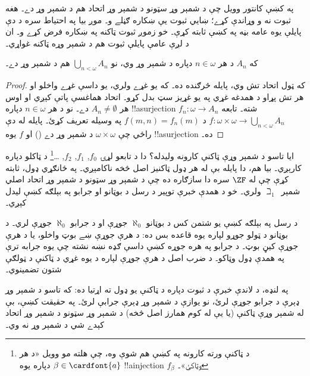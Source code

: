 \documentclass[../../../include/open-logic-section]{subfiles}
\begin{document}
\begin{ex}
په \citeyear{Cantor1878} کښې کانتور وويل
چې د شمېر وړ سټونو د شمېر وړ اتحاد هم
د شمېر وړ دے۔ هغه ثبوت نه و وړاندې کړے؛
ښايي ثبوت يې ښکاره ګڼلے و۔ موږ بيا په
احتياط سره د دې پايلې يوه عامه بڼه په
کښې ثابته کړې۔ خو زموږ ثبوت ټاکنه
په ښکاره فرض کړے و۔ ان د لږې عامې
پايلې ثبوت هم د شمېر وړه ټاکنه غواړي۔

\begin{thm}
که $A_n$ د هر $n \in \omega$
دپاره د شمېر وړ وي، نو $\bigcup_{n <
\omega} A_n$ هم د شمېر وړ دے۔
\end{thm}

\begin{proof}
که ټول اتحاد تش وي، پايله څرګنده ده۔ که يو غړے
ولري، يو داسې غړے واخلو او هر تش پړاو د همدغه غړي
په يو غړيز سټ بدل کړو۔ اتحاد هماغسې پاتې کېږي او اوس
هر $A_n \neq \emptyset$ دے۔ نو د هر $n \in \omega$ دپاره
!!a{surjection} $f_n \colon \omega
\to A_n$ شته۔ تابعه $f \colon \omega
\times \omega \to \bigcup_{n <
\omega} A_n$ د $f(m, n) = f_n(m)$
په وسيله تعريف کړئ۔ پايله له دې راځي چې
$\omega
\times \omega$ د شمېر وړ دے
()
او $f$ يوه !!a{surjection} ده۔
\end{proof}
\noindent
ايا تاسو د شمېر وړې ټاکنې کارونه وليدله؟
دا د تابعو لړۍ $f_0$, $f_1$, $f_2$,
\dots\footnote{د ټاکنې ورته کارونه په
کښې هم شوې وه، چې هلته مو وويل «د هر
$\beta \in \cardfont{a}$ دپاره يوه
!!a{injection} $f_\beta$ وټاکئ»۔}
د ټاکلو دپاره کارېږي۔ بيا هم، دا پايله
بې له هر ډول ټاکنيز اصل څخه ناکامېږي۔
په ځانګړي ډول،
\citet{FefermanLevy1963} ثابته کړې
چې له $\ZF$ سره دا سازګاره ده چې
د شمېر وړ سټونو د شمېر وړ اتحاد اصلي
شمېر~$\beth_1$ ولري۔ خو د همدې خبرې
توپير د رسل د بوټانو او جرابو په بېلګه کښې ليدل کېږي۔
\begin{explain}
  د رسل په بېلګه کښې يو شتمن کس د بوټانو $\aleph_0$ جوړې
  او د جرابو $\aleph_0$ جوړې لري۔ د بوټانو د ټولو جوړو
  لپاره يوه قاعده بس ده: د هرې جوړې ښے بوټ واخلو، يا د
  هرې جوړې کيڼ بوټ۔ د جرابو په هره جوړه کښې داسې ګډه
  نښه نشته چې يوه جرابه ترې په همدې ډول وټاکو۔ د ضرب
  اصل د هرې جوړې لپاره د يوه غړي د ټاکنې د ټولګې شتون
  تضمينوي۔ \citep[p.~126]{Russell1919}
\end{explain}
په لنډه، د لاندې خبرې د ثبوت دپاره
د ټاکنې يو ډول ته اړتيا ده: که تاسو
د شمېر وړ ډېرې د جرابو جوړې لرئ،
نو يوازې د شمېر وړ ډېرې جرابې لرئ۔
په حقيقت کښې، بې له شمېر وړې ټاکنې
(يا يې له کوم همارز اصل څخه) د شمېر وړ
سټونو د شمېر وړ اتحاد کېدے شي د شمېر
وړ نه وي۔
\end{ex}
\end{document}
